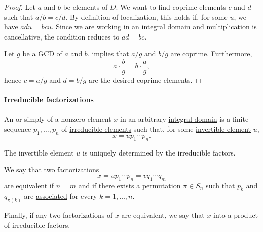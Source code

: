 \begin{proof}
   Let \( a \) and \( b \) be elements of \( D \). We want to find coprime elements \( c \) and \( d \) such that \( a / b = c / d \). By definition of localization, this holds if, for some \( u \), we have \( adu = bcu \). Since we are working in an integral domain and multiplication is cancellative, the condition reduces to \( ad = bc \).

  Let \( g \) be a GCD of \( a \) and \( b \).  implies that \( a / g \) and \( b / g \) are coprime. Furthermore,
  \begin{equation*}
    a \cdot \frac b g = b \cdot \frac a g,
  \end{equation*}
  hence \( c = a / g \) and \( d = b / g \) are the desired coprime elements.
\end{proof}

\paragraph{Irreducible factorizations}

\begin{definition}\label{def:irreducible_factorization}
  An  or simply  of a nonzero element \( x \) in an arbitrary \hyperref[def:integral_domain]{integral domain} is a finite sequence \( p_1, \ldots, p_n \) of \hyperref[def:domain_divisibility/irreducible]{irreducible elements} such that, for some \hyperref[def:divisibility/invertible]{invertible element} \( u \),
  \begin{equation*}
    x = u p_1 \cdots p_n.
  \end{equation*}

  The invertible element \( u \) is uniquely determined by the irreducible factors.

  \begin{thmenum}
     We say that two factorizations
    \begin{equation*}
      x = u p_1 \cdots p_n = v q_1 \cdots q_m
    \end{equation*}
    are equivalent if \( n = m \) and if there exists a \hyperref[def:symmetric_group]{permutation} \( \pi \in S_n \) such that \( p_k \) and \( q_{\pi(k)} \) are \hyperref[def:domain_divisibility/associates]{associated} for every \( k = 1, \ldots, n \).

     Finally, if any two factorizations of \( x \) are equivalent, we say that \( x \)  into a product of irreducible factors.
  \end{thmenum}
\end{definition}

